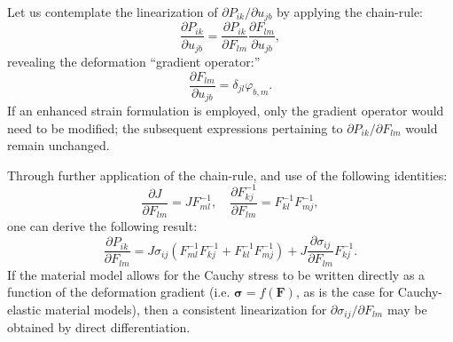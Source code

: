 	Let us contemplate the linearization of $\partial P_{ik} / \partial u_{jb}$ by applying the chain-rule:
	\begin{equation}
		\frac{\partial P_{ik}}{\partial u_{jb}} = \frac{\partial P_{ik}}{\partial F_{lm}} \frac{\partial F_{lm}}{\partial u_{jb}},
	\end{equation}
	revealing the deformation ``gradient operator:''
	\begin{equation}
		\frac{\partial F_{lm}}{\partial u_{jb}} = \delta_{jl} \varphi_{b,m}.
	\end{equation}
	If an enhanced strain formulation is employed, only the gradient operator would need to be modified; the subsequent expressions pertaining to $\partial P_{ik} / \partial F_{lm}$ would remain unchanged.

	
	Through further application of the chain-rule, and use of the following identities:
	\begin{equation}
		\frac{\partial J}{\partial F_{lm}} = J F_{ml}^{-1}, \quad \frac{\partial F_{kj}^{-1}}{\partial F_{lm}} = F_{kl}^{-1} F_{mj}^{-1},
	\end{equation}
	one can derive the following result:
	\begin{equation}
		\frac{\partial P_{ik}}{\partial F_{lm}} = J \sigma_{ij} (F_{ml}^{-1} F_{kj}^{-1} + F_{kl}^{-1} F_{mj}^{-1})  + J \frac{\partial \sigma_{ij}}{\partial F_{lm}} F_{kj}^{-1}.
	\end{equation}
	If the material model allows for the Cauchy stress to be written directly as a function of the deformation gradient (i.e. $\boldsymbol{\sigma} = f(\mathbf{F})$, as is the case for Cauchy-elastic material models), then a consistent linearization for $\partial \sigma_{ij} / \partial F_{lm}$ may be obtained by direct differentiation.
	
